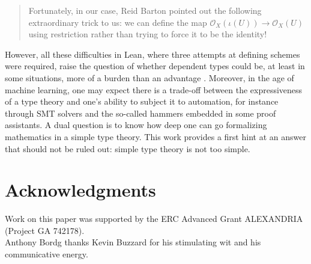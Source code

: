 \documentclass[12pt]{scrartcl}
\begin{document}
\begin{quote}
	Fortunately, in our case, Reid Barton pointed out the following extraordinary trick to us: we can define the map $\mathscr{O}_X(\iota(U)) \rightarrow \mathscr{O}_X(U)$ using restriction rather than trying to force it to be the identity! \cite[3.5.]{schemesinLean}
\end{quote}	    
However, all these difficulties in Lean, where three attempts at defining schemes were required, raise the question of whether dependent types could be, at least in some situations, more of a burden than an advantage \cite{PaulsonLamport}. Moreover, in the age of machine learning, one may expect there is a trade-off between the expressiveness of a type theory and one's ability to subject it to automation, for instance through SMT solvers and the so-called hammers embedded in some proof assistants. A dual question is to know how deep one can go formalizing mathematics in a simple type theory. This work provides a first hint at an answer that should not be ruled out: simple type theory is not too simple.        

\section*{Acknowledgments}

Work on this paper was supported by the ERC Advanced Grant ALEXANDRIA (Project GA 742178).  \\
Anthony Bordg thanks Kevin Buzzard for his stimulating wit and his communicative energy.			



\end{document}
